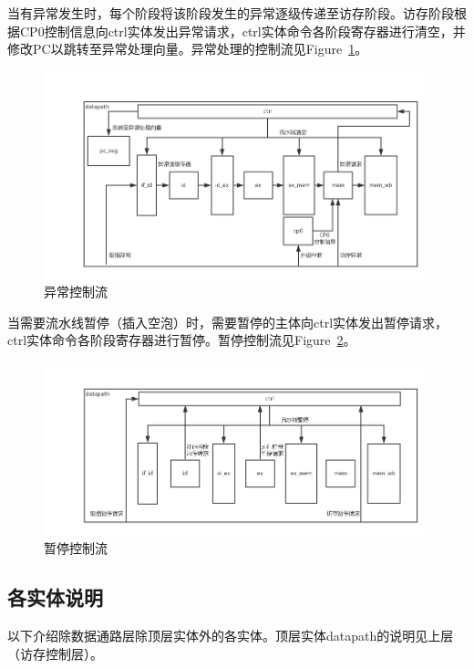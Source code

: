 \documentclass{article}
\begin{document}
\begin{spacing}{1.4}
当有异常发生时，每个阶段将该阶段发生的异常逐级传递至访存阶段。访存阶段根据CP0控制信息向ctrl实体发出异常请求，ctrl实体命令各阶段寄存器进行清空，并修改PC以跳转至异常处理向量。异常处理的控制流见Figure~\ref{fig:datapath-exception-flow}。

\begin{figure}[!htb]
	\centering
	\includegraphics[width=\textwidth]{datapath-exception-flow.png}
	\caption{异常控制流}
    \label{fig:datapath-exception-flow}
\end{figure}

当需要流水线暂停（插入空泡）时，需要暂停的主体向ctrl实体发出暂停请求，ctrl实体命令各阶段寄存器进行暂停。暂停控制流见Figure~\ref{fig:datapath-stall-flow}。

\begin{figure}[!htb]
	\centering
	\includegraphics[width=\textwidth]{datapath-stall-flow.png}
	\caption{暂停控制流}
    \label{fig:datapath-stall-flow}
\end{figure}

\subsection{各实体说明}

以下介绍除数据通路层除顶层实体外的各实体。顶层实体datapath的说明见上层（访存控制层）。


\end{spacing}
\end{document}
